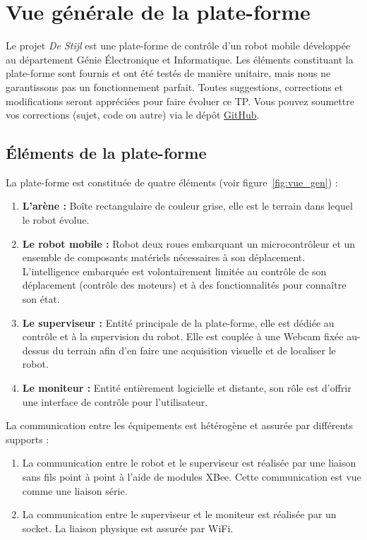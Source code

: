 \section{Vue générale de la plate-forme}

Le projet {\it De Stijl} est une plate-forme de contrôle d'un robot mobile développée au département Génie \'Electronique et Informatique.  Les éléments constituant la plate-forme sont fournis et ont été testés de manière unitaire, mais nous ne garantissons pas un fonctionnement parfait. Toutes suggestions, corrections et modifications seront appréciées pour faire évoluer ce TP. Vous pouvez soumettre vos corrections (sujet, code ou autre) via le dépôt \href{https://github.com/INSA-GEI/dumber/tree/stable}{GitHub}.

\subsection{\'Eléments de la plate-forme}

La plate-forme est constituée de quatre éléments (voir figure~\ref{fig:vue_gen}) : 
\begin{enumerate}
\item {\bf L'arène :} Boîte rectangulaire de couleur grise, elle est le terrain dans lequel le robot évolue.%
\item {\bf Le robot mobile :} Robot deux roues embarquant un microcontrôleur et un ensemble de composants matériels nécessaires à son déplacement. L'intelligence embarquée est volontairement limitée au contrôle de son déplacement (contrôle des moteurs) et à des fonctionnalités pour connaître son état.
\item {\bf Le superviseur :} Entité principale de la plate-forme, elle est dédiée au contrôle et à la supervision du robot. Elle est couplée à une Webcam fixée au-dessus du terrain afin d'en faire une acquisition visuelle et de localiser le robot.
\item {\bf Le moniteur :} Entité entièrement logicielle et distante, son rôle est d'offrir une interface de contrôle pour l'utilisateur.\\
 \end{enumerate}

La communication entre les équipements est hétérogène et assurée par différents supports :
\begin{enumerate}
\item La communication entre le robot et le superviseur est réalisée par une liaison sans fils point à point à l'aide de modules XBee. Cette communication est vue comme une liaison série.
\item La communication entre le superviseur et le moniteur est réalisée par un socket. La liaison physique est assurée par WiFi.
\end{enumerate}


